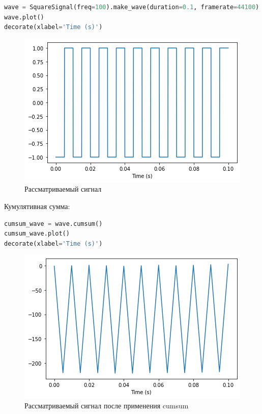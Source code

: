\begin{lstlisting}[language=Python]
wave = SquareSignal(freq=100).make_wave(duration=0.1, framerate=44100)
wave.plot()
decorate(xlabel='Time (s)')
\end{lstlisting}
\begin{figure}[H]
	\begin{center}
		\includegraphics[scale=1]{fig/lab09/lab09_9_0.png}
		\caption{Рассматриваемый сигнал}
	\end{center}
\end{figure}

Кумулятивная сумма:

\begin{lstlisting}[language=Python]
cumsum_wave = wave.cumsum()
cumsum_wave.plot()
decorate(xlabel='Time (s)')
\end{lstlisting}
\begin{figure}[H]
	\begin{center}
		\includegraphics[scale=1]{fig/lab09/lab09_11_0.png}
		\caption{Рассматриваемый сигнал после применения cumsum}
	\end{center}
\end{figure}

